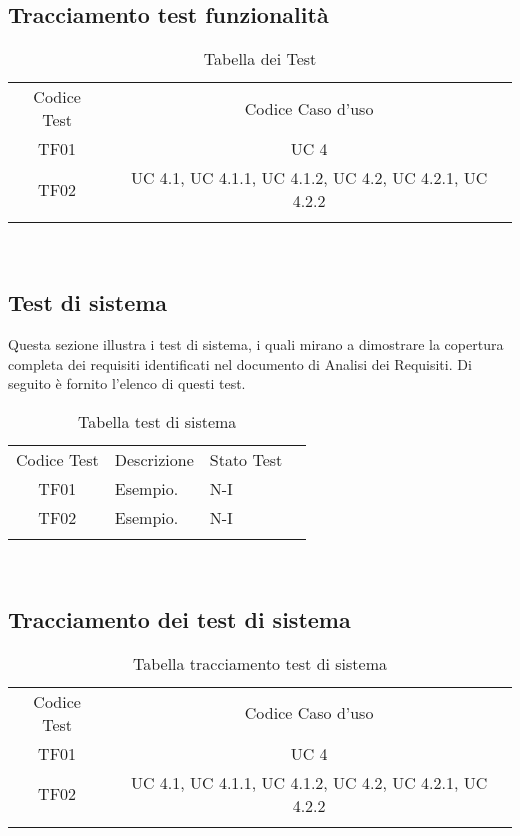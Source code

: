 \subsection{Tracciamento test funzionalità}
\begin{table}[htbp]
    \centering
    \begin{tabular}{|c|c|}
        \hhline{--}
        Codice Test & Codice Caso d'uso \\
        \hhline{--}
        TF01 & UC 4 \\
        \hhline{--}
        TF02 & UC 4.1, UC 4.1.1, UC 4.1.2, UC 4.2, UC 4.2.1, UC 4.2.2 \\
        \hhline{--}
    \end{tabular}
    \caption{Tabella dei Test}
    \label{tab:testsTracciamentoFunz}
\end{table}
\\
\subsection{Test di sistema}Questa sezione illustra i test di sistema, i quali mirano a dimostrare la copertura completa dei requisiti identificati nel documento di Analisi dei Requisiti. Di seguito è fornito l'elenco di questi test.
\\
\begin{table}[htbp]
    \centering
    \begin{tabular}{|c|p{3cm}|p{5cm}|c|}
        \hhline{----}
        Codice Test & Descrizione & Stato Test \\
        \hhline{---}
        TF01 & Esempio. & N-I \\
        \hhline{----}
        TF02 & Esempio. & N-I \\
        \hhline{----}
    \end{tabular}
    \caption{Tabella test di sistema}
    \label{tab:testsSistema}
\end{table}
\\
\subsection{Tracciamento dei test di sistema}
\begin{table}[htbp]
    \centering
    \begin{tabular}{|c|c|}
        \hhline{--}
        Codice Test & Codice Caso d'uso \\
        \hhline{--}
        TF01 & UC 4 \\
        \hhline{--}
        TF02 & UC 4.1, UC 4.1.1, UC 4.1.2, UC 4.2, UC 4.2.1, UC 4.2.2 \\
        \hhline{--}
    \end{tabular}
    \caption{Tabella tracciamento test di sistema}
    \label{tab:testsTracciamentoSist}
\end{table}

